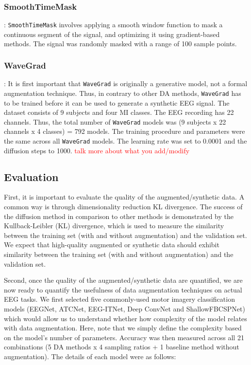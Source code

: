 \documentclass[12pt]{iopart}
\begin{document}
\subsubsection{SmoothTimeMask}:
\texttt{SmoothTimeMask} involves applying a smooth window function to mask a continuous segment of the signal, and optimizing it using gradient-based methods. The signal was randomly masked with a range of 100 sample points.

\subsubsection{WaveGrad}:
It is first important that \texttt{WaveGrad} is originally a generative model, not a formal augmentation technique.  Thus, in contrary to other DA methods, \texttt{WaveGrad} has to be trained before it can be used to generate a synthetic EEG signal.   The dataset consists of 9 subjects and four MI classes. The EEG recording has 22 channels. Thus, the total number of \texttt{WaveGrad} models was (9 subjects x 22 channels x 4 classes) = 792 models.  The training procedure and parameters were the same across all \texttt{WaveGrad} models. The learning rate was set to 0.0001 and the diffusion steps to 1000.  \textcolor{red}{talk more about what you add/modify}

\subsection{Evaluation}
First, it is important to evaluate the quality of the augmented/synthetic data.  A common way is through dimensionality reduction KL divergence. The success of the diffusion method in comparison to other methods is demonstrated by the Kullback-Leibler (KL) divergence, which is used to measure the similarity between the training set (with and without augmentation) and the validation set. We expect that high-quality augmented or synthetic data should exhibit similarity between the training set (with and without augmentation) and the validation set.

Second, once the quality of the augmented/synthetic data are quantified, we are now ready to quantify the usefulness of data augmentation techniques on actual EEG tasks.  We first selected five commonly-used motor imagery classification models (EEGNet, ATCNet, EEG-ITNet, Deep ConvNet and ShallowFBCSPNet) which would allow us to understand whether how complexity of the model relates with data augmentation.  Here, note that we simply define the complexity based on the model's number of parameters. Accuracy was then measured across all 21 combinations (5 DA methods x 4 sampling ratios + 1 baseline method without augmentation).  The details of each model were as follows:
\end{document}
